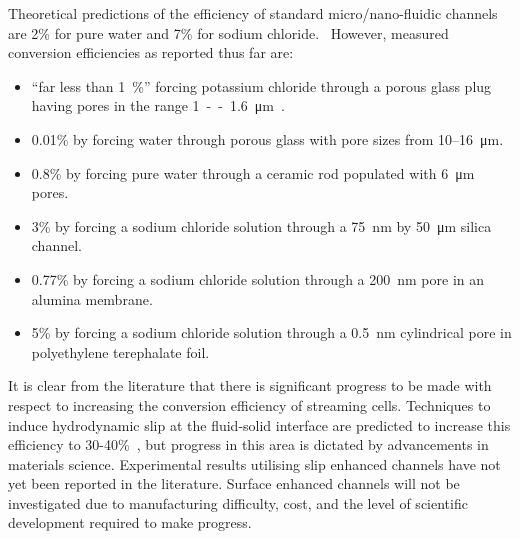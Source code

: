   Theoretical predictions of the efficiency of standard micro/nano-fluidic channels are 2\% for pure water and 7\% for sodium chloride.~\cite{VanderHeyden2006}
  However, measured conversion efficiencies as reported thus far are:
  \begin{itemize}
    \item ``far less than \SI{1}{\percent}'' forcing potassium chloride through a porous glass plug having pores in the range \SI{1}--\SI{1.6}{\micro\meter}~\cite{Olthuis2005}.
    \item 0.01\% by forcing water through porous glass with pore sizes from 10\thinspace--\SI{16}{\micro\metre}.~\cite{Yang2003}
    \item 0.8\% by forcing pure water through a ceramic rod populated with \SI{6}{\micro\metre} pores.~\cite{Yang2004}
    \item 3\% by forcing a sodium chloride solution through a \SI{75}{\nano\metre} by \SI{50}{\micro\metre} silica channel.~\cite{Heyden2007}
    \item 0.77\% by forcing a sodium chloride solution through a \SI{200}{\nano\metre} pore in an alumina membrane.~\cite{Lu2006}
    \item 5\% by forcing a sodium chloride solution through a \SI{0.5}{\nano\metre} cylindrical pore in polyethylene terephalate foil.~\cite{Xie2008}
  \end{itemize}
  It is clear from the literature that there is significant progress to be made with respect to increasing the conversion efficiency of streaming cells.
  Techniques to induce hydrodynamic slip at the fluid-solid interface are predicted to increase this efficiency to 30-40\%~\cite{Davidson2008a, Ren2008}, but progress in this area is dictated by advancements in materials science.
  Experimental results utilising slip enhanced channels have not yet been reported in the literature.
  Surface enhanced channels will not be investigated due to manufacturing difficulty, cost, and the level of scientific development required to make progress.


